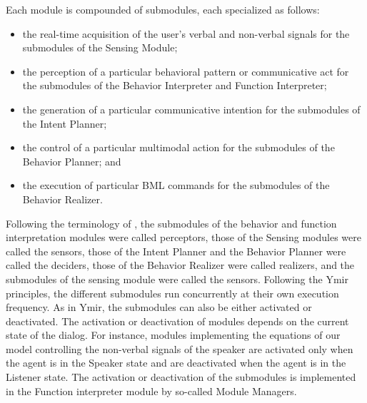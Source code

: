 \documentclass[twocolumn]{svjour3}
\begin{document}
Each module is compounded of submodules, each specialized as follows: \begin{itemize}
	\item the real-time acquisition of the user's verbal and non-verbal signals for the submodules of the Sensing Module;
	\item the perception of a particular behavioral pattern or communicative act for the submodules of the Behavior Interpreter and Function Interpreter;
	\item the generation of a particular communicative intention for the submodules of the Intent Planner;
	\item the control of a particular multimodal action for the submodules of the Behavior Planner; and
	\item the execution of particular BML commands for the submodules of the Behavior Realizer.
	\end{itemize}		
	Following the terminology of \cite{thorisson_mind_1999}, the submodules of the behavior and function interpretation modules were called perceptors, those of the Sensing modules were called the sensors, those of the Intent Planner and the Behavior Planner were called the deciders, those of the Behavior Realizer were called realizers, and the submodules of the sensing module were called the sensors.  
Following the Ymir principles, the different submodules run concurrently at their own execution frequency. 
As in Ymir, the submodules can also be either activated or deactivated. 
The activation or deactivation of modules depends on the current state of the dialog. 
For instance, modules implementing the equations of our model controlling the non-verbal signals of the speaker are activated only when the agent is in the Speaker state  and are deactivated when the agent is in the Listener  state. 
The activation or deactivation of the submodules is implemented in the Function interpreter module by so-called Module Managers. 
\end{document}
